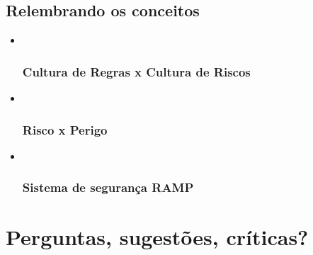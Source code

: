 \documentclass[
  letterpaper,
  DIV=11,
  numbers=noendperiod]{scrartcl}
\begin{document}
\subsection{Relembrando os conceitos}\label{relembrando-os-conceitos}

\begin{itemize}
\item ~
  \subsubsection{Cultura de Regras x Cultura de
  Riscos}\label{cultura-de-regras-x-cultura-de-riscos}
\item ~
  \subsubsection{Risco x Perigo}\label{risco-x-perigo}
\item ~
  \subsubsection{Sistema de segurança
  RAMP}\label{sistema-de-seguranuxe7a-ramp}
\end{itemize}

\section{Perguntas, sugestões,
críticas?}\label{perguntas-sugestuxf5es-cruxedticas}
\end{document}
